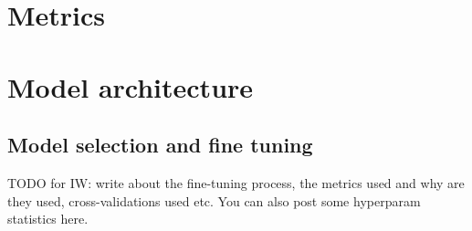 \section{Metrics}

\section{Model architecture}

\subsection{Model selection and fine tuning}

TODO for IW: write about the fine-tuning process, the metrics used and why are they used, cross-validations used etc. You can also post some hyperparam statistics here.
